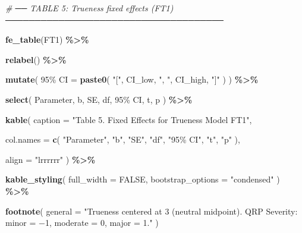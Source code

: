 \documentclass[
]{article}
\newenvironment{Shaded}{\begin{snugshade}}{\end{snugshade}}
\newcommand{\AttributeTok}[1]{\textcolor[rgb]{0.13,0.29,0.53}{#1}}
\newcommand{\CommentTok}[1]{\textcolor[rgb]{0.56,0.35,0.01}{\textit{#1}}}
\newcommand{\ConstantTok}[1]{\textcolor[rgb]{0.56,0.35,0.01}{#1}}
\newcommand{\FunctionTok}[1]{\textcolor[rgb]{0.13,0.29,0.53}{\textbf{#1}}}
\newcommand{\NormalTok}[1]{#1}
\newcommand{\OtherTok}[1]{\textcolor[rgb]{0.56,0.35,0.01}{#1}}
\newcommand{\SpecialCharTok}[1]{\textcolor[rgb]{0.81,0.36,0.00}{\textbf{#1}}}
\newcommand{\StringTok}[1]{\textcolor[rgb]{0.31,0.60,0.02}{#1}}
\begin{document}
\begin{Shaded}
\begin{Highlighting}[]
\CommentTok{\# ── TABLE 5: Trueness fixed effects (FT1) ─────────────────────────────────────}

\FunctionTok{fe\_table}\NormalTok{(FT1) }\SpecialCharTok{\%\textgreater{}\%}

  \FunctionTok{relabel}\NormalTok{() }\SpecialCharTok{\%\textgreater{}\%}

  \FunctionTok{mutate}\NormalTok{(}
    \StringTok{\textasciigrave{}}\AttributeTok{95\% CI}\StringTok{\textasciigrave{}} \OtherTok{=}
      \FunctionTok{paste0}\NormalTok{(}
        \StringTok{"["}\NormalTok{,}
\NormalTok{        CI\_low,}
        \StringTok{", "}\NormalTok{,}
\NormalTok{        CI\_high,}
        \StringTok{"]"}
\NormalTok{      )}
\NormalTok{  ) }\SpecialCharTok{\%\textgreater{}\%}

  \FunctionTok{select}\NormalTok{(}
\NormalTok{    Parameter,}
\NormalTok{    b,}
\NormalTok{    SE,}
\NormalTok{    df,}
    \StringTok{\textasciigrave{}}\AttributeTok{95\% CI}\StringTok{\textasciigrave{}}\NormalTok{,}
\NormalTok{    t,}
\NormalTok{    p}
\NormalTok{  ) }\SpecialCharTok{\%\textgreater{}\%}

  \FunctionTok{kable}\NormalTok{(}
    \AttributeTok{caption =}
      \StringTok{"Table 5. Fixed Effects for Trueness Model FT1"}\NormalTok{,}

    \AttributeTok{col.names =} \FunctionTok{c}\NormalTok{(}
      \StringTok{"Parameter"}\NormalTok{,}
      \StringTok{"b"}\NormalTok{,}
      \StringTok{"SE"}\NormalTok{,}
      \StringTok{"df"}\NormalTok{,}
      \StringTok{"95\% CI"}\NormalTok{,}
      \StringTok{"t"}\NormalTok{,}
      \StringTok{"p"}
\NormalTok{    ),}

    \AttributeTok{align =} \StringTok{"lrrrrrr"}
\NormalTok{  ) }\SpecialCharTok{\%\textgreater{}\%}

  \FunctionTok{kable\_styling}\NormalTok{(}
    \AttributeTok{full\_width =} \ConstantTok{FALSE}\NormalTok{,}
    \AttributeTok{bootstrap\_options =} \StringTok{"condensed"}
\NormalTok{  ) }\SpecialCharTok{\%\textgreater{}\%}

  \FunctionTok{footnote}\NormalTok{(}
    \AttributeTok{general =}
      \StringTok{"Trueness centered at 3 (neutral midpoint). QRP Severity: minor = −1, moderate = 0, major = 1."}
\NormalTok{  )}
\end{Highlighting}
\end{Shaded}
\end{document}

